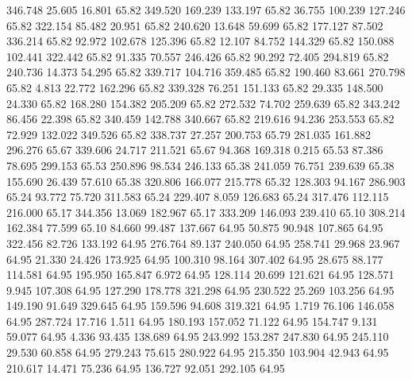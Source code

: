  346.748   25.605   16.801        65.82
 349.520  169.239  133.197        65.82
  36.755  100.239  127.246        65.82
 322.154   85.482   20.951        65.82
 240.620   13.648   59.699        65.82
 177.127   87.502  336.214        65.82
  92.972  102.678  125.396        65.82
  12.107   84.752  144.329        65.82
 150.088  102.441  322.442        65.82
  91.335   70.557  246.426        65.82
  90.292   72.405  294.819        65.82
 240.736   14.373   54.295        65.82
 339.717  104.716  359.485        65.82
 190.460   83.661  270.798        65.82
   4.813   22.772  162.296        65.82
 339.328   76.251  151.133        65.82
  29.335  148.500   24.330        65.82
 168.280  154.382  205.209        65.82
 272.532   74.702  259.639        65.82
 343.242   86.456   22.398        65.82
 340.459  142.788  340.667        65.82
 219.616   94.236  253.553        65.82
  72.929  132.022  349.526        65.82
 338.737   27.257  200.753        65.79
 281.035  161.882  296.276        65.67
 339.606   24.717  211.521        65.67
  94.368  169.318    0.215        65.53
  87.386   78.695  299.153        65.53
 250.896   98.534  246.133        65.38
 241.059   76.751  239.639        65.38
 155.690   26.439   57.610        65.38
 320.806  166.077  215.778        65.32
 128.303   94.167  286.903        65.24
  93.772   75.720  311.583        65.24
 229.407    8.059  126.683        65.24
 317.476  112.115  216.000        65.17
 344.356   13.069  182.967        65.17
 333.209  146.093  239.410        65.10
 308.214  162.384   77.599        65.10
  84.660   99.487  137.667        64.95
  50.875   90.948  107.865        64.95
 322.456   82.726  133.192        64.95
 276.764   89.137  240.050        64.95
 258.741   29.968   23.967        64.95
  21.330   24.426  173.925        64.95
 100.310   98.164  307.402        64.95
  28.675   88.177  114.581        64.95
 195.950  165.847    6.972        64.95
 128.114   20.699  121.621        64.95
 128.571    9.945  107.308        64.95
 127.290  178.778  321.298        64.95
 230.522   25.269  103.256        64.95
 149.190   91.649  329.645        64.95
 159.596   94.608  319.321        64.95
   1.719   76.106  146.058        64.95
 287.724   17.716    1.511        64.95
 180.193  157.052   71.122        64.95
 154.747    9.131   59.077        64.95
   4.336   93.435  138.689        64.95
 243.992  153.287  247.830        64.95
 245.110   29.530   60.858        64.95
 279.243   75.615  280.922        64.95
 215.350  103.904   42.943        64.95
 210.617   14.471   75.236        64.95
 136.727   92.051  292.105        64.95
